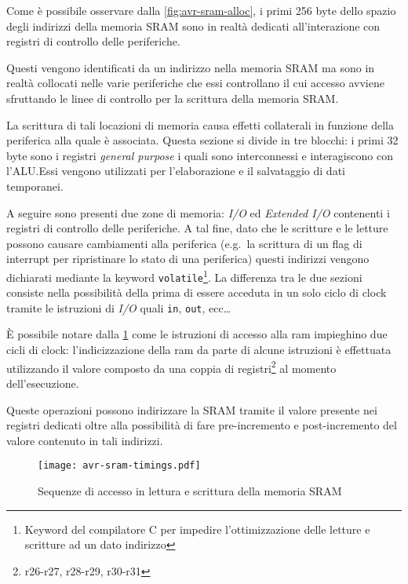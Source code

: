 Come è possibile osservare dalla \cref{fig:avr-sram-alloc}, i primi 256 byte dello spazio degli indirizzi della memoria SRAM sono in realtà dedicati all'interazione con registri di controllo delle periferiche.

Questi vengono identificati da un indirizzo nella memoria SRAM ma sono in realtà collocati nelle varie periferiche che essi controllano il cui accesso avviene sfruttando le linee di controllo per la scrittura della memoria SRAM\cite[fig 14-2]{avr:m328p}.

La scrittura di tali locazioni di memoria causa effetti collaterali in funzione della periferica alla quale è associata. Questa sezione si divide in tre blocchi: i primi 32 byte sono i registri \textit{general purpose} i quali sono interconnessi e interagiscono con l'ALU.\@ Essi vengono utilizzati per l'elaborazione e il salvataggio di dati temporanei.

A seguire sono presenti due zone di memoria: \textit{I/O} ed \textit{Extended I/O} contenenti i registri di controllo delle periferiche. A tal fine, dato che le scritture e le letture possono causare cambiamenti alla periferica (e.g.\ la scrittura di un flag di interrupt per ripristinare lo stato di una periferica) questi indirizzi vengono dichiarati mediante la keyword \texttt{volatile}\footnote{Keyword del compilatore C per impedire l'ottimizzazione delle letture e scritture ad un dato indirizzo}. La differenza tra le due sezioni consiste nella possibilità della prima di essere acceduta in un solo ciclo di clock tramite le istruzioni di \textit{I/O}\cite[sec 8.5]{avr:m328p} quali \texttt{in}, \texttt{out}, ecc\ldots

È possibile notare dalla \cref{fig:avr-sram-timings} come le istruzioni di accesso alla ram impieghino due cicli di clock: l'indicizzazione della ram da parte di alcune istruzioni è effettuata utilizzando il valore composto da una coppia di registri\footnote{r26-r27, r28-r29, r30-r31} al momento dell'esecuzione. 

Queste operazioni possono indirizzare la SRAM tramite il valore presente nei registri dedicati oltre alla possibilità di fare pre-incremento e post-incremento del valore contenuto in tali indirizzi.

\begin{figure}[b]
    \centering
    \texttt{[image: avr-sram-timings.pdf]}
    \caption[Immagine rielaborata a partire dalla fig. 8-4 del documento~\cite{avr:m328p}]{Sequenze di accesso in lettura e scrittura della memoria SRAM\cite[fig 8-4]{avr:m328p}}\label{fig:avr-sram-timings}
\end{figure}

